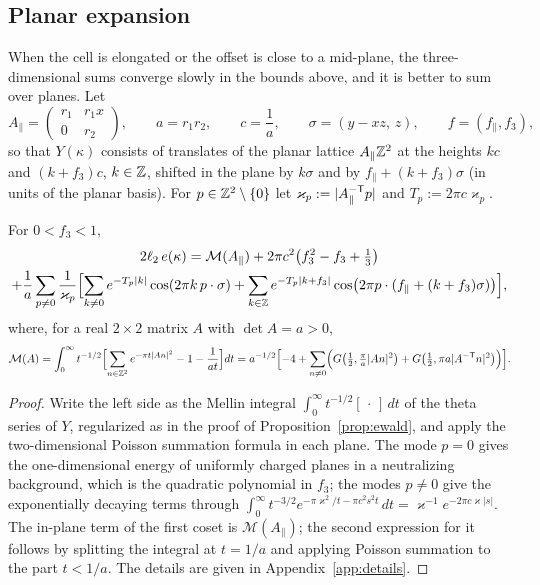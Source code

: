\subsection{Planar expansion}\label{ssec:planar}

When the cell is elongated or the offset is close to a mid-plane, the three-dimensional sums converge slowly in the bounds above, and
it is better to sum over planes. Let
\[
  A_\parallel=\begin{pmatrix}r_1&r_1x\\0&r_2\end{pmatrix},\qquad a=r_1r_2,\qquad c=\frac1a,\qquad \sigma=(y-xz,\,z),\qquad f=(f_\parallel,f_3),
\]
so that $Y(\kappa)$ consists of translates of the planar lattice $A_\parallel\mathbb Z^2$ at the heights $kc$ and $(k+f_3)c$, $k\in\mathbb Z$, shifted
in the plane by $k\sigma$ and by $f_\parallel+(k+f_3)\sigma$ (in units of the planar basis). For $p\in\mathbb Z^2\setminus\{0\}$ let
$\varkappa_p:=|A_\parallel^{-\mathsf T}p|$ and $T_p:=2\pi c\varkappa_p$.

\begin{lemma}\label{lem:planar}
For $0<f_3<1$,
\begin{multline}\label{eq:planar}
  2\ell_2\,e(\kappa)=\mathcal M(A_\parallel)+2\pi c^2\bigl(f_3^2-f_3+\tfrac13\bigr)\\
   +\frac1a\sum_{p\ne0}\frac1{\varkappa_p}\Bigl[\sum_{k\ne0}e^{-T_p|k|}\cos(2\pi k\,p\cdot\sigma)
   +\sum_{k\in\mathbb Z}e^{-T_p|k+f_3|}\cos\bigl(2\pi p\cdot(f_\parallel+(k+f_3)\sigma)\bigr)\Bigr],
\end{multline}
where, for a real $2\times2$ matrix $A$ with $\det A=a>0$,
\begin{equation}\label{eq:M2}
  \mathcal M(A)=\int_0^\infty t^{-1/2}\Bigl[\sum_{n\in\mathbb Z^2}e^{-\pi t|An|^2}-1-\frac1{at}\Bigr]dt
  =a^{-1/2}\Bigl[-4+\sum_{n\ne0}\Bigl(G\bigl(\tfrac12,\tfrac\pi a|An|^2\bigr)+G\bigl(\tfrac12,\pi a|A^{-\mathsf T}n|^2\bigr)\Bigr)\Bigr].
\end{equation}
\end{lemma}

\begin{proof}
Write the left side as the Mellin integral $\int_0^\infty t^{-1/2}[\,\cdot\,]\,dt$ of the theta series of $Y$, regularized as in the
proof of Proposition~\ref{prop:ewald}, and apply the two-dimensional Poisson summation formula in each plane. The mode $p=0$ gives the
one-dimensional energy of uniformly charged planes in a neutralizing background, which is the quadratic polynomial in $f_3$; the modes
$p\ne0$ give the exponentially decaying terms through
$\int_0^\infty t^{-3/2}e^{-\pi\varkappa^2/t-\pi c^2s^2t}\,dt=\varkappa^{-1}e^{-2\pi c\varkappa|s|}$. The in-plane term of the first
coset is $\mathcal M(A_\parallel)$; the second expression for it follows by splitting the integral at $t=1/a$ and applying Poisson
summation to the part $t<1/a$. The details are given in Appendix~\ref{app:details}.
\end{proof}

